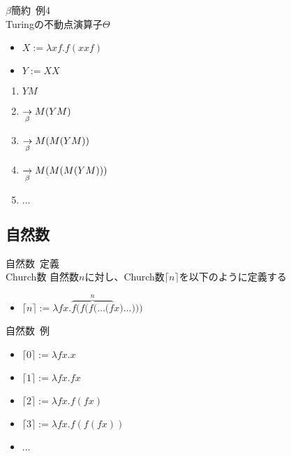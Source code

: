 \documentclass[pdflatex,17pt]{beamer}
\begin{document}
\begin{frame}{$\beta$簡約~例4 \\ \small Turingの不動点演算子$\Theta$}
    \begin{itemize}
        \item \small $X := \lambda x f. f (x x f)$
        \item \small $Y := XX$
    \end{itemize}
    \begin{enumerate}
        \item \small $YM$
        \item \small $\underset{\beta}{\to} M(YM)$
        \item \small $\underset{\beta}{\to} M(M(YM))$
        \item \small $\underset{\beta}{\to} M(M(M(YM)))$
        \item \small $\dots$
    \end{enumerate}
\end{frame}

\newcommand{\church}[1]{\lceil #1 \rceil}
\subsection{自然数}
\subsectionpage
\begin{frame}{自然数~定義 \\ \small Church数}
    自然数$n$に対し、Church数$\church{n}$を以下のように定義する
    \begin{itemize}
        \item $\church{n} := \lambda f x. \overbrace{f (f (f (\dots (f}^n x) \dots)))$
    \end{itemize}
\end{frame}

\begin{frame}{自然数~例}
    \begin{itemize}
        \item $\church{0} := \lambda f x. x$
        \item $\church{1} := \lambda f x. f x$
        \item $\church{2} := \lambda f x. f (f x)$
        \item $\church{3} := \lambda f x. f (f (f x))$
        \item $\dots$
    \end{itemize}
\end{frame}
\end{document}
